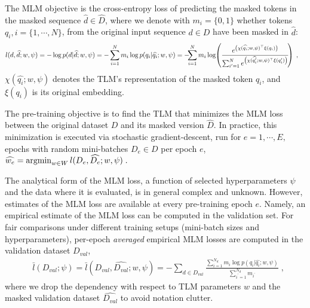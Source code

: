 The MLM objective is the cross-entropy loss of predicting the masked tokens in the masked sequence $\widehat{d}\in\widehat{D}$, where we denote with $m_{i}=\{0,1\}$ whether tokens $q_i, i=\{1, \cdots, N\}$, from the original input sequence $d \in D$ have been masked in $\widehat{d}$:
\begin{align}
l(d, \widehat{d}; w, \psi) &= -\log p(d|\widehat{d}; w, \psi)
= -\sum_{i=1}^N m_{i} \log p(q_i|\widehat{q_i}; w, \psi) = -\hspace*{-1ex} \sum_{i=1}^N m_{i} \log \hspace*{-0.5ex}\left( \frac{e^{\left(\chi(\widehat{q_i};w, \psi)^\top \xi(q_i)\right)}}{\sum_{i^\prime=1}^{N} e^{\left(\chi(\widehat{q_{i}^\prime};w, \psi)^\top \xi(q_{i}^\prime)\right)}}\hspace*{-0.5ex}
\right) \;,
\label{eq:mlm_loss}
\end{align}
$\chi(\widehat{q_{i}};w, \psi)$ denotes the TLM's representation of the masked token $q_i$,
and $\xi(q_i)$ is its original embedding.

The pre-training objective is to find the TLM that minimizes the MLM loss between the original dataset $D$ and its masked version $\widehat{D}$.
%
In practice, this minimization is executed via stochastic gradient-descent,
run for $e=1,\cdots, E,$ epochs with random mini-batches $D_{e} \in D$ per epoch $e$,
$
\widehat{w_e}=\argmin_{w \in W} l(D_{e}, \widehat{D_e}; w, \psi) \;.%
$

The analytical form of the MLM loss, a function of selected hyperparameters $\psi$ and the data where it is evaluated, is in general complex and unknown.
However, estimates of the MLM loss are available at every pre-training epoch $e$.
Namely, an empirical estimate of the MLM loss can be computed in the validation set.
%
For fair comparisons under different training setups (\eg mini-batch sizes and hyperparameters), per-epoch \textit{averaged} empirical MLM losses are computed in the validation dataset $D_{val}$,
\begin{align}
&\bar{l}(D_{val};\psi)=\bar{l}(D_{val}, \widehat{D_{val}}; w, \psi) = - \sum_{d \in D_{val}} \frac{\sum_{i=1}^{N_d} m_{i} \log p(q_i|\widehat{q_i}; w, \psi)}{\sum_{i^\prime=1}^{N_d} m_{i^\prime}} \; ,
\label{eq:mlm_averagedloss}
\end{align}
where we drop the dependency with respect to TLM parameters $w$ and the masked validation dataset $\widehat{D_{val}}$ to avoid notation clutter.
